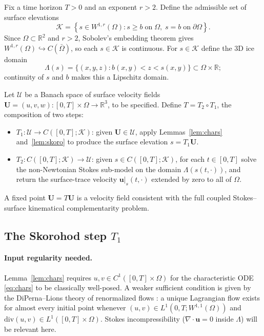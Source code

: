 \documentclass[hidelinks,onefignum,onetabnum,final]{siamart220329}  %
\newcommand{\RR}{\mathbb{R}}
\newcommand{\Div}{\nabla\cdot}
\newcommand{\bu}{\mathbf{u}}
\newcommand{\bU}{\mathbf{U}}
\newcommand{\cK}{\mathcal{K}}
\newcommand{\cU}{\mathcal{U}}
\begin{document}
Fix a time horizon $T>0$ and an exponent $r > 2$.  Define the admissible
set of surface elevations
\begin{equation}
\cK = \left\{s \in W^{1,r}(\Omega) : s \ge b \;\text{on}\; \Omega,\;
         s = b \;\text{on}\; \partial\Omega\right\}.
\label{eq:app:admissible}
\end{equation}
Since $\Omega \subset \RR^2$ and $r > 2$, Sobolev's embedding theorem gives
$W^{1,r}(\Omega) \hookrightarrow C(\bar\Omega)$, so each $s\in\cK$ is
continuous.  For $s\in\cK$ define the 3D ice domain
\begin{equation}
\Lambda(s) = \{(x,y,z) : b(x,y) < z < s(x,y)\} \subset \Omega\times\RR;
\label{eq:app:domain}
\end{equation}
continuity of $s$ and $b$ makes this a Lipschitz domain.

Let $\cU$ be a Banach space of surface velocity fields
$\bU = (u,v,w): [0,T]\times\Omega\to\RR^3$, to be specified.  Define
$T = T_2 \circ T_1$, the composition of two steps:
\begin{itemize}
\item $T_1:\cU \to C([0,T];\cK)$: given $\bU \in \cU$, apply
Lemmas~\ref{lem:chars} and~\ref{lem:skoro} to produce the surface
elevation $s = T_1 \bU$.
\item $T_2:C([0,T];\cK) \to \cU$: given $s\in C([0,T];\cK)$, for
each $t\in[0,T]$ solve the non-Newtonian Stokes sub-model
\cite{GreveBlatter2009} on the domain $\Lambda(s(t,\cdot))$,
and return the surface-trace velocity $\bu|_s(t,\cdot)$ extended by
zero to all of $\Omega$.
\end{itemize}
A fixed point $\bU = T\bU$ is a velocity field consistent with the
full coupled Stokes--surface kinematical complementarity problem.

\subsection{The Skorohod step \texorpdfstring{$T_1$}{T1}}

\paragraph{Input regularity needed.}
Lemma~\ref{lem:chars} requires $u,v \in C^1([0,T]\times\Omega)$ for
the characteristic ODE \eqref{eq:chars} to be classically well-posed.
A weaker sufficient condition is given by the DiPerna--Lions theory
of renormalized flows \cite{DiPernaLions1989}: a unique Lagrangian
flow exists for almost every initial point whenever
$(u,v) \in L^1(0,T;W^{1,1}(\Omega))$ and
$\mathrm{div}(u,v) \in L^1([0,T]\times\Omega)$.
Stokes incompressibility ($\Div\bu=0$ inside $\Lambda$) will be
relevant here.
\end{document}

